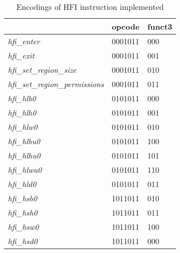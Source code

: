 \documentclass[conference,compsoc]{IEEEtran}
\begin{document}
\begin{table}[]
\caption{Encodings of HFI instruction implemented}
\label{tab:hfi_instructions}
\begin{tabular}{|l|l|l|}
\hline
                                         &  opcode   & funct3   \\ \hline
\textit{hfi\_enter}                      &  0001011  &  000     \\ \hline
\textit{hfi\_exit}                       &  0001011  &  001     \\ \hline
\textit{hfi\_set\_region\_size}          &  0001011  &  010     \\ \hline
\textit{hfi\_set\_region\_permissions}   &  0001011  &  011     \\ \hline
\textit{hfi\_hlb0}                       &  0101011  &  000     \\ \hline
\textit{hfi\_hlh0}                       &  0101011  &  001     \\ \hline
\textit{hfi\_hlw0}                       &  0101011  &  010     \\ \hline
\textit{hfi\_hlbu0}                      &  0101011  &  100     \\ \hline
\textit{hfi\_hlhu0}                      &  0101011  &  101     \\ \hline
\textit{hfi\_hlwu0}                      &  0101011  &  110     \\ \hline
\textit{hfi\_hld0}                       &  0101011  &  011     \\ \hline
\textit{hfi\_hsb0}                       &  1011011  &  010     \\ \hline
\textit{hfi\_hsh0}                       &  1011011  &  011     \\ \hline
\textit{hfi\_hsw0}                       &  1011011  &  100     \\ \hline
\textit{hfi\_hsd0}                       &  1011011  &  000     \\ \hline
\end{tabular}
\end{table}
\end{document}
